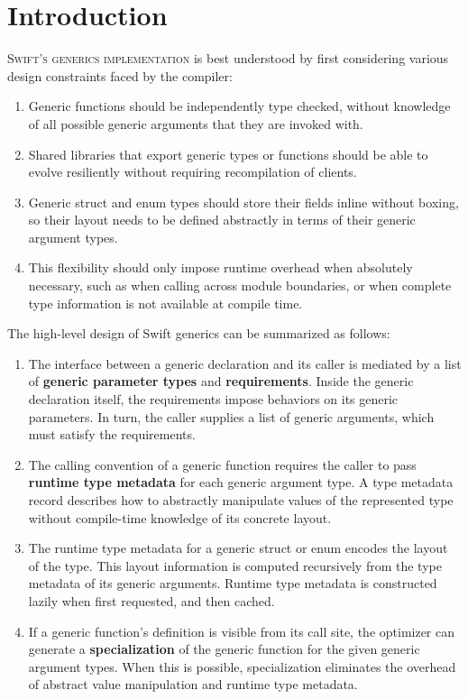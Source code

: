 \documentclass[../generics]{subfiles}
\begin{document}
\chapter{Introduction}\label{chap:introduction}

\lettrine{S}{wift's generics implementation} is best understood by first considering various design constraints faced by the compiler:
\begin{enumerate}
\item Generic functions should be independently type checked, without knowledge of all possible generic arguments that they are invoked with.
\item Shared libraries that export generic types or functions should be able to evolve resiliently without requiring recompilation of clients.
\item Generic struct and enum types should store their fields inline without boxing, so their layout needs to be defined abstractly in terms of their generic argument types.
\item This flexibility should only impose runtime overhead when absolutely necessary, such as when calling across module boundaries, or when complete type information is not available at compile time.
\end{enumerate}

\noindent The high-level design of Swift generics can be summarized as follows:
\begin{enumerate}
\item The interface between a generic declaration and its caller is mediated by a list of \textbf{generic parameter types} and \textbf{requirements}. Inside the generic declaration itself, the requirements impose behaviors on its generic parameters. In turn, the caller supplies a list of generic arguments, which must satisfy the requirements.
\item The calling convention of a generic function requires the caller to pass \textbf{runtime type metadata} for each generic argument type. A type metadata record describes how to abstractly manipulate values of the represented type without compile-time knowledge of its concrete layout.
\item The runtime type metadata for a generic struct or enum encodes the layout of the type. This layout information is computed recursively from the type metadata of its generic arguments. Runtime type metadata is constructed lazily when first requested, and then cached.
\item If a generic function's definition is visible from its call site, the optimizer can generate a \textbf{specialization} of the generic function for the given generic argument types. When this is possible, specialization eliminates the overhead of abstract value manipulation and runtime type metadata.
\end{enumerate}
\end{document}
